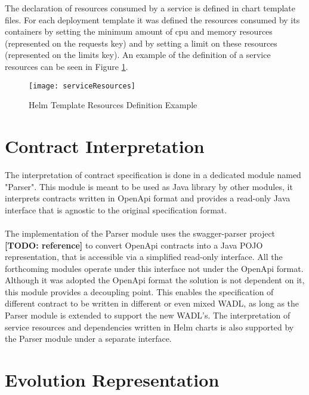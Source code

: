 \newpage

The declaration of resources consumed by a service is defined in chart template files.
For each deployment template it was defined the resources consumed by its containers by
setting the minimum amount of cpu and memory resources (represented on the requests key) and by setting a limit on these resources (represented on the limits key).
An example of the definition of a service resources can be seen in Figure \ref{fig:serviceResources}.

\begin{figure}[htbp]
    \centering
    \texttt{[image: serviceResources]}
    \caption{Helm Template Resources Definition Example}
    \label{fig:serviceResources}
\end{figure}

\section{Contract Interpretation} %
\label{sec:contract_interpretation}

The interpretation of contract specification is done in a dedicated module named "Parser".
This module is meant to be used as Java library by other modules,
it interprets contracts written in OpenApi format and provides a read-only Java interface
that is agnostic to the original specification format.

\paragraph{}

The implementation of the Parser module uses the swagger-parser project \textbf{[TODO: reference]} to convert OpenApi contracts into a Java POJO representation, that is accessible via a simplified read-only interface.
All the forthcoming modules operate under this interface not under the OpenApi format.
Although it was adopted the OpenApi format the solution is not dependent on it, this module provides a decoupling point.
This enables the specification of different contract to be written in different or even mixed WADL,
as long as the Parser module is extended to support the new WADL's.
The interpretation of service resources and dependencies written in Helm charts is also supported by the Parser module under a separate interface.

\newpage

\section{Evolution Representation} %
\label{sec:evolution_representation}

